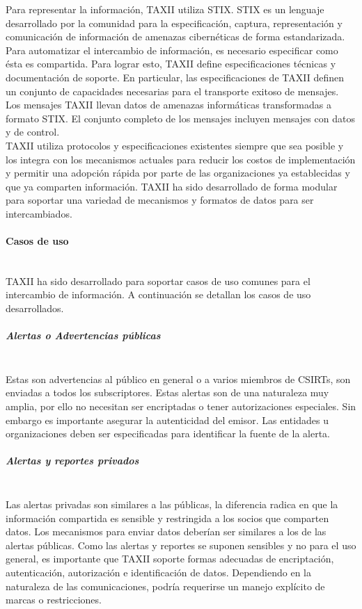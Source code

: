 Para representar la información, TAXII utiliza STIX. STIX es un 
lenguaje desarrollado por la comunidad para la especificación, captura, 
representación y comunicación de información de amenazas cibernéticas de forma 
estandarizada.\\

Para automatizar el intercambio de información, es necesario especificar como 
ésta es compartida. Para lograr esto, TAXII define especificaciones técnicas y 
documentación de soporte. En particular, las especificaciones de TAXII definen 
un conjunto de capacidades necesarias para el transporte exitoso de mensajes. 
Los mensajes TAXII llevan datos de amenazas informáticas transformadas a 
formato STIX. El conjunto completo de los mensajes incluyen mensajes con datos y 
de control.\\

TAXII utiliza protocolos y especificaciones existentes siempre que sea posible y 
los integra con los mecanismos actuales para reducir los costos de 
implementación y permitir una adopción rápida por parte de las organizaciones ya 
establecidas y que ya comparten información. TAXII ha sido desarrollado de forma 
modular para soportar una variedad de mecanismos y formatos de datos para ser 
intercambiados.

\paragraph{Casos de uso}\ \\

TAXII ha sido desarrollado para soportar casos de uso comunes para el 
intercambio de información. A continuación se detallan los casos de uso 
desarrollados.

\subparagraph{Alertas o Advertencias públicas}\ \\

Estas son advertencias al público en general o a varios miembros de CSIRTs, son 
enviadas a todos los subscriptores. Estas alertas son de una naturaleza muy 
amplia, por ello no necesitan ser encriptadas o tener autorizaciones especiales. 
Sin embargo es importante asegurar la autenticidad del emisor. Las entidades u 
organizaciones deben ser especificadas para identificar la fuente de la alerta.

\subparagraph{Alertas y reportes privados}\ \\

Las alertas privadas son similares a las públicas, la diferencia radica en que 
la información compartida es sensible y restringida a los socios que 
comparten datos. Los mecanismos para enviar datos deberían ser similares a los 
de las alertas públicas. Como las alertas y reportes se suponen sensibles y no 
para el uso general, es importante que TAXII soporte formas adecuadas de 
encriptación, autenticación, autorización e identificación de datos. Dependiendo 
en la naturaleza de las comunicaciones, podría requerirse un manejo explícito de 
marcas o restricciones.\\

